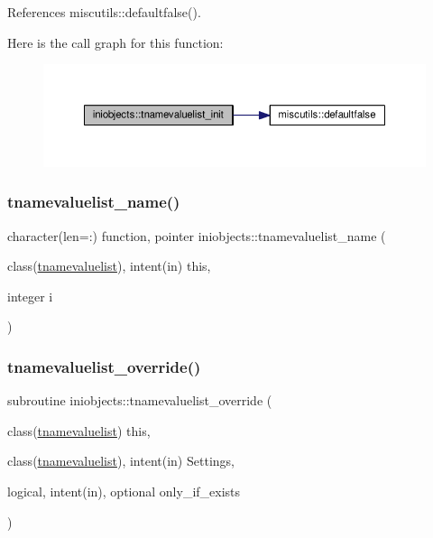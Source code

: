 References miscutils\+::defaultfalse().

Here is the call graph for this function\+:
\nopagebreak
\begin{figure}[H]
\begin{center}
\leavevmode
\includegraphics[width=350pt]{namespaceiniobjects_aaa5d8364fae58e251714849bb64e5124_cgraph}
\end{center}
\end{figure}
\mbox{\label{namespaceiniobjects_a4f92f7df639bb521266ea3f6be8dbc47}} 
\subsubsection{\texorpdfstring{tnamevaluelist\+\_\+name()}{tnamevaluelist\_name()}}
{\footnotesize\ttfamily character(len=\+:) function, pointer iniobjects\+::tnamevaluelist\+\_\+name (\begin{DoxyParamCaption}\item[{class(\mbox{\hyperlink{structiniobjects_1_1tnamevaluelist}{tnamevaluelist}}), intent(in)}]{this,  }\item[{integer}]{i }\end{DoxyParamCaption})\hspace{0.3cm}{\ttfamily [private]}}

\mbox{\label{namespaceiniobjects_a96ec4d817cb41567afeefde7d8c0c7ec}} 
\subsubsection{\texorpdfstring{tnamevaluelist\+\_\+override()}{tnamevaluelist\_override()}}
{\footnotesize\ttfamily subroutine iniobjects\+::tnamevaluelist\+\_\+override (\begin{DoxyParamCaption}\item[{class(\mbox{\hyperlink{structiniobjects_1_1tnamevaluelist}{tnamevaluelist}})}]{this,  }\item[{class(\mbox{\hyperlink{structiniobjects_1_1tnamevaluelist}{tnamevaluelist}}), intent(in)}]{Settings,  }\item[{logical, intent(in), optional}]{only\+\_\+if\+\_\+exists }\end{DoxyParamCaption})\hspace{0.3cm}{\ttfamily [private]}}



